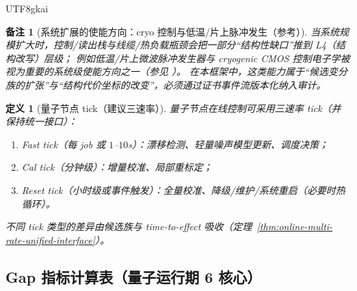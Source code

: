 \documentclass[12pt]{article}
\newtheorem{definition}{定义}[section]
\newtheorem{remark}{备注}[section]
\begin{document}
\begin{CJK*}{UTF8}{gkai}
\begin{remark}[系统扩展的使能方向：cryo 控制与低温/片上脉冲发生（参考）]
当系统规模扩大时，控制/读出栈与线缆/热负载瓶颈会把一部分“结构性缺口”推到 L4（结构改写）层级；
例如低温/片上微波脉冲发生器与 cryogenic CMOS 控制电子学被视为重要的系统级使能方向之一（参见 \cite{ref_naturecomm_cryogenic_pulse_gen,ref_prxq_5_010326}）。
在本框架中，这类能力属于“候选变分族的扩张”与“结构代价坐标的改变”，必须通过证书事件流版本化纳入审计。
\end{remark}

\begin{definition}[量子节点 tick（建议三速率）]
\label{def:online-qpu-ticks}
量子节点在线控制可采用三速率 tick（并保持统一接口）：
\begin{enumerate}
  \item Fast tick（每 job 或 $1$--$10$s）：漂移检测、轻量噪声模型更新、调度决策；
  \item Cal tick（分钟级）：增量校准、局部重标定；
  \item Reset tick（小时级或事件触发）：全量校准、降级/维护/系统重启（必要时热循环）。
\end{enumerate}
不同 tick 类型的差异由候选族与 time-to-effect 吸收（定理~\ref{thm:online-multi-rate-unified-interface}）。
\end{definition}

\subsection{Gap 指标计算表（量子运行期 6 核心）}
\label{sec:online-qpu-gap-table}


\end{CJK*}
\end{document}
